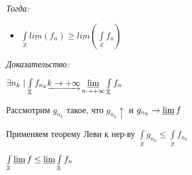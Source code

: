 \documentclass[paper=a4, fontsize=13.2pt]{article}
\begin{document}
\emph{Тогда:}

\begin{itemize}
	\item $ \int\limits_{\mathbb{X}} \underline{lim}( f_n ) \geq \underline{lim}( \int\limits_{\mathbb{X}} f_n ) $
\end{itemize}

\emph{Доказательство:}

$ \exists n_k \mid \int\limits_{\mathbb{X}} f_{n_k} \underrightarrow{k \rightarrow +\infty} 
\varliminf\limits_{n \rightarrow +\infty} \int\limits_{\mathbb{X}} f_n $

Рассмотрим $ g_{n_k} $ такое, что $ g_{n_k} \uparrow $ и $ g_{n_k} \rightarrow \varliminf f $
 
Применяем теорему Леви к нер-ву $ \int\limits_{\mathbb{X}} g_{n_k} \leq \int\limits_{\mathbb{X}} f_{n_k}$

$ \int\limits_{\mathbb{X}} \varliminf f \leq \varliminf \int\limits_{\mathbb{X}} f_n $
\end{document}
